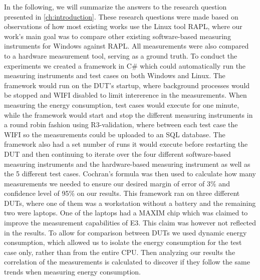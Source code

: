 In the following, we will summarize the answers to the research question presented in \cref{ch:introduction}. These research questions were made based on observations of how most existing works use the Linux tool RAPL, where our work's main goal was to compare other existing software-based measuring instruments for Windows against RAPL. All measurements were also compared to a hardware measurement tool, serving as a ground truth. To conduct the experiments we created a framework in C\# which could automatically run the measuring instruments and test cases on both Windows and Linux. The framework would run on the DUT's startup, where background processes would be stopped and WIFI disabled to limit intererence in the measurements. When measuring the energy consumption, test cases would execute for one minute, while the framework would start and stop the different measuring instruments in a round robin fashion using R3-validation, where between each test case the WIFI so the measurements could be uploaded to an SQL database. The framework also had a set number of runs it would execute before restarting the DUT and then continuing to iterate over the four different software-based measuring instruments and the hardware-based measuring instrument as well as the 5 different test cases. Cochran's formula was then used to calculate how many measurements we needed to ensure our desired margin of error of 3\% and confidence level of 95\% on our results. This framework ran on three different DUTs, where one of them was a workstation without a battery and the remaining two were laptops. One of the laptops had a MAXIM chip which was claimed to improve the measurement capabilities of E3. This claim was however not reflected in the results. To allow for comparison between DUTs we used dynamic energy consumption, which allowed us to isolate the energy consumption for the test case only, rather than from the entire CPU. Then analyzing our results the correlation of the measurements is calculated to discover if they follow the same trends when measuring energy consumption.





